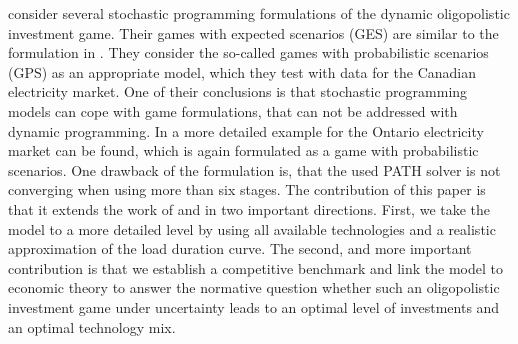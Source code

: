 \cite{Genc2007} consider several stochastic programming formulations of the dynamic oligopolistic investment game. Their games with expected scenarios (GES) are similar to the formulation in \cite{Pineau2003}. They consider the so-called games with probabilistic scenarios (GPS) as an appropriate model, which they test with data for the Canadian electricity market. One of their conclusions is that stochastic programming models can cope with game formulations, that can not be addressed with dynamic programming. In \cite{Genc2008} a more detailed example for the Ontario electricity market can be found, which is again formulated as a game with probabilistic scenarios. One drawback of the formulation is, that the used PATH solver is not converging when using more than six stages.
The contribution of this paper is that it extends the work of \cite{Genc2007} and  \cite{Genc2008} in two important directions. First, we take the model to a more detailed level by using all available technologies and a realistic approximation of the load duration curve. The second, and more important contribution is that we establish a competitive benchmark and link the model to economic theory to answer the normative question whether such an oligopolistic investment game under uncertainty leads to an optimal level of investments and an optimal technology mix.






